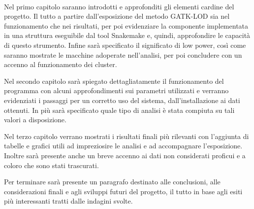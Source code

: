 \documentclass[12pt, a4paper]{report}
\begin{document}
\\
Nel primo capitolo saranno introdotti e approfonditi gli elementi cardine del progetto. Il tutto a partire dall'esposizione del metodo GATK-LOD sia nel funzionamento che nei risultati, per poi evidenziare la componente implementata in una struttura eseguibile dal tool Snakemake e, quindi, approfondire le capacità di questo strumento. Infine sarà specificato il significato di low power, così come saranno mostrate le macchine adoperate nell'analisi, per poi concludere con un accenno al funzionamento dei cluster. 

Nel secondo capitolo sarà spiegato dettagliatamente il funzionamento del programma con alcuni approfondimenti sui parametri utilizzati e verranno evidenziati i passaggi per un corretto uso del sistema, dall'installazione ai dati ottenuti. In più sarà specificato quale tipo di analisi è stata compiuta su tali valori a disposizione.

Nel terzo capitolo verrano mostrati i risultati finali più rilevanti con l'aggiunta di tabelle e grafici utili ad impreziosire le analisi e ad accompagnare l'esposizione. Inoltre sarà presente anche un breve accenno ai dati non considerati proficui e a coloro che sono stati trascurati. 

Per terminare sarà presente un paragrafo destinato alle conclusioni, alle considerazioni finali e agli sviluppi futuri del progetto, il tutto in base agli esiti più interessanti tratti dalle indagini svolte.
\end{document}
